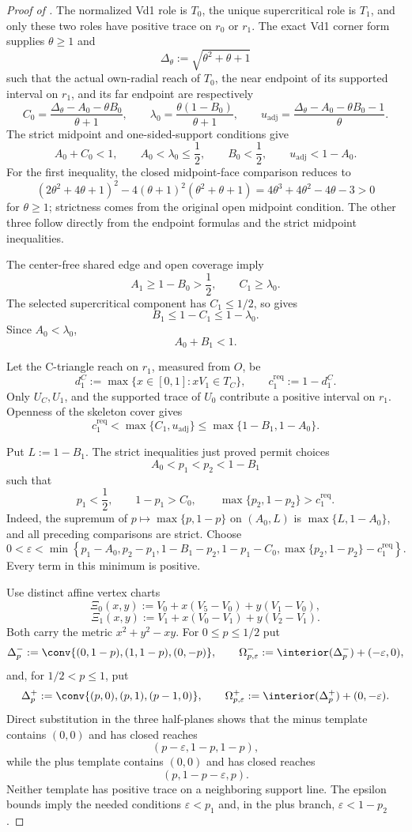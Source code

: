 \begin{proof}[Proof of ]
The normalized Vd1 role is $T_0$, the unique supercritical role is $T_1$,
and only these two roles have positive trace on $r_0$ or $r_1$.  The exact
Vd1 corner form supplies $\theta\ge1$ and
\[
 \Delta_\theta:=\sqrt{\theta^2+\theta+1}
\]
such that the actual own-radial reach of $T_0$, the near endpoint of its
supported interval on $r_1$, and its far endpoint are respectively
\[
 C_0=\frac{\Delta_\theta-A_0-\theta B_0}{\theta+1},
 \qquad
 \lambda_0=\frac{\theta(1-B_0)}{\theta+1},
 \qquad
 u_{\mathrm{adj}}=
 \frac{\Delta_\theta-A_0-\theta B_0-1}{\theta}.
\]
The strict midpoint and one-sided-support conditions give
\[
 A_0+C_0<1,
 \qquad A_0<\lambda_0\le\frac12,
 \qquad B_0<\frac12,
 \qquad u_{\mathrm{adj}}<1-A_0.
\]
For the first inequality, the closed midpoint-face comparison reduces to
\[
 (2\theta^2+4\theta+1)^2
 -4(\theta+1)^2(\theta^2+\theta+1)
 =4\theta^3+4\theta^2-4\theta-3>0
\]
for $\theta\ge1$; strictness comes from the original open midpoint
condition.  The other three follow directly from the endpoint formulas and
the strict midpoint inequalities.

The center-free shared edge and open coverage imply
\[
 A_1\ge1-B_0>\frac12,
 \qquad C_1\ge\lambda_0.
\]
The selected supercritical component has $C_1\le1/2$, so
 gives
\[
 B_1\le1-C_1\le1-\lambda_0.
\]
Since $A_0<\lambda_0$,
\[
 A_0+B_1<1.
\]

Let the C-triangle reach on $r_1$, measured from $O$, be
\[
 d_1^C:=\max\{x\in[0,1]:xV_1\in T_C\},
 \qquad c_1^{\mathrm{req}}:=1-d_1^C.
\]
Only $U_C,U_1$, and the supported trace of $U_0$ contribute a positive
interval on $r_1$.  Openness of the skeleton cover gives
\[
 c_1^{\mathrm{req}}<\max\{C_1,u_{\mathrm{adj}}\}
 \le\max\{1-B_1,1-A_0\}.
\]

Put $L:=1-B_1$.  The strict inequalities just proved permit choices
\[
 A_0<p_1<p_2<1-B_1
\]
such that
\[
 p_1<\frac12,
 \qquad 1-p_1>C_0,
 \qquad \max\{p_2,1-p_2\}>c_1^{\mathrm{req}}.
\]
Indeed, the supremum of $p\mapsto\max\{p,1-p\}$ on $(A_0,L)$ is
$\max\{L,1-A_0\}$, and all preceding comparisons are strict.  Choose
\[
0<\varepsilon<
\min\left\{
p_1-A_0,
p_2-p_1,
1-B_1-p_2,
1-p_1-C_0,
\max\{p_2,1-p_2\}-c_1^{\mathrm{req}}
\right\}.
\]
Every term in this minimum is positive.

Use distinct affine vertex charts
\[
 \Xi_0(x,y):=V_0+x(V_5-V_0)+y(V_1-V_0),
\]
\[
 \Xi_1(x,y):=V_1+x(V_0-V_1)+y(V_2-V_1).
\]
Both carry the metric $x^2+y^2-xy$.  For $0\le p\le1/2$ put
\[
 \Delta_p^-:=\conv\{(0,1-p),(1,1-p),(0,-p)\},
 \qquad
 \Omega_{p,\varepsilon}^-:=
 \interior(\Delta_p^-)+(-\varepsilon,0),
\]
and, for $1/2<p\le1$, put
\[
 \Delta_p^+:=\conv\{(p,0),(p,1),(p-1,0)\},
 \qquad
 \Omega_{p,\varepsilon}^+:=
 \interior(\Delta_p^+)+(0,-\varepsilon).
\]
Direct substitution in the three half-planes shows that the minus template
contains $(0,0)$ and has closed reaches
\[
 (p-\varepsilon,1-p,1-p),
\]
while the plus template contains $(0,0)$ and has closed reaches
\[
 (p,1-p-\varepsilon,p).
\]
Neither template has positive trace on a neighboring support line.  The
epsilon bounds imply the needed conditions $\varepsilon<p_1$ and, in the
plus branch, $\varepsilon<1-p_2$.


\end{proof}
